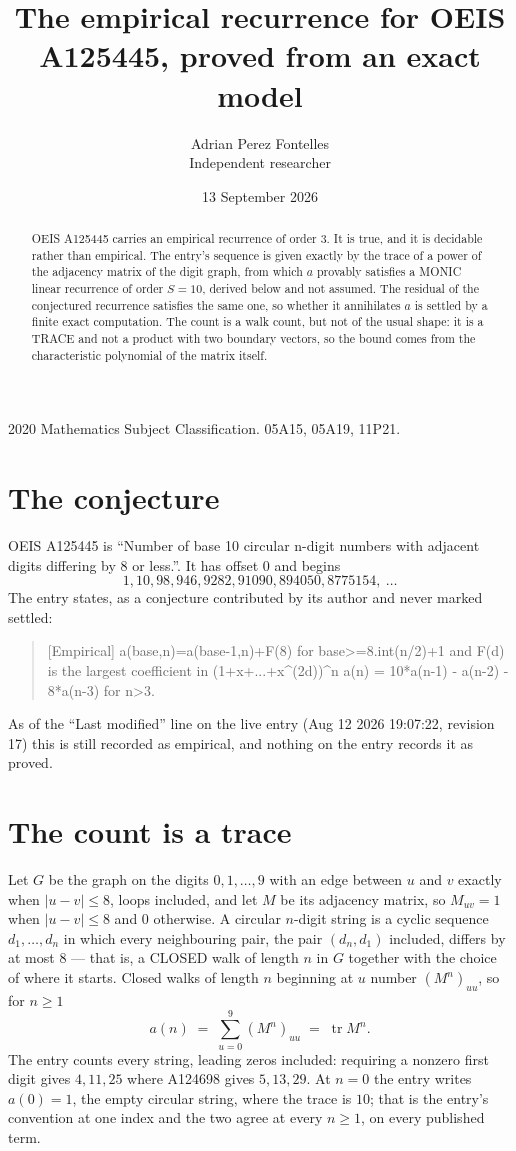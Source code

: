 \documentclass[11pt,a4paper]{article}
\title{The empirical recurrence for OEIS A125445, proved from an exact model}
\author{Adrian Perez Fontelles\\ \small Independent researcher}
\date{13 September 2026}
\theoremstyle{plain}
\theoremstyle{definition}
\begin{document}
\maketitle

\begin{abstract}
OEIS A125445 carries an empirical recurrence of order $3$. It is true, and it is
decidable rather than empirical. The entry's sequence is given exactly by the trace of a power of the adjacency matrix of the digit graph, from
which $a$ provably satisfies a MONIC linear recurrence of order $S=10$, derived below and not
assumed. The residual of the conjectured recurrence satisfies the same one, so whether it
annihilates $a$ is settled by a finite exact computation. The count is a walk count, but not of the usual shape: it is a TRACE and not a product with two boundary vectors, so the bound comes from the characteristic polynomial of the matrix itself.
\end{abstract}

\noindent\small 2020 Mathematics Subject Classification. 05A15, 05A19, 11P21.\normalsize

\section{The conjecture}

OEIS A125445 is ``Number of base 10 circular n-digit numbers with adjacent digits differing by 8 or less.''. It has offset $0$ and begins
\[
1, 10, 98, 946, 9282, 91090, 894050, 8775154,\ \dots
\]
The entry states, as a conjecture contributed by its author and never marked settled:
\begin{quote}
[Empirical] a(base,n)=a(base-1,n)+F(8) for base>=8.int(n/2)+1 and F(d) is the largest coefficient in (1+x+...+x\^{}(2d))\^{}n a(n) = 10*a(n-1) - a(n-2) - 8*a(n-3) for n>3.
\end{quote}
As of the ``Last modified'' line on the live entry (Aug 12 2026 19:07:22, revision 17)
this is still recorded as empirical, and nothing on the entry records it as proved.

\section{The count is a trace}

Let $G$ be the graph on the digits $0,1,\dots,9$ with an edge between $u$ and $v$ exactly
when $|u-v|\le8$, loops included, and let $M$ be its adjacency matrix, so $M_{uv}=1$ when
$|u-v|\le8$ and $0$ otherwise. A circular $n$-digit string is a cyclic sequence
$d_1,\dots,d_n$ in which every neighbouring pair, the pair $(d_n,d_1)$ included, differs by at
most $8$ --- that is, a CLOSED walk of length $n$ in $G$ together with the choice of where it
starts. Closed walks of length $n$ beginning at $u$ number $(M^n)_{uu}$, so for $n\ge1$
\[
a(n)\;=\;\sum_{u=0}^{9}(M^{n})_{uu}\;=\;\operatorname{tr}M^{n} .
\]
The entry counts every string, leading zeros included: requiring a nonzero first digit gives
$4,11,25$ where A124698 gives $5,13,29$. At $n=0$ the entry writes $a(0)=1$, the empty circular
string, where the trace is $10$; that is the entry's convention at one index and the two agree
at every $n\ge1$, on every published term.
\end{document}
